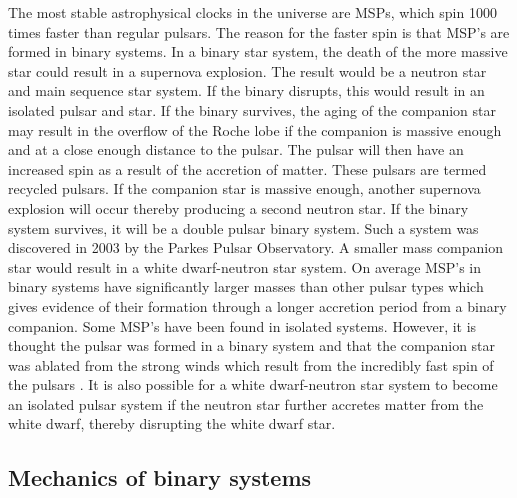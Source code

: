 \documentclass[12pt]{article}
\begin{document}
	
	
	
	
	
	\noindent The most stable astrophysical clocks in the universe are MSPs, which spin 1000 times faster than regular pulsars. The reason for the faster spin is that MSP's are formed in binary systems. In a binary star system, the death of the more massive star could result in a supernova explosion. The result would be a neutron star and main sequence star system. If the binary disrupts, this would result in an isolated pulsar and star. If the binary survives, the aging of the companion star may result in the overflow of the Roche lobe if the companion is massive enough and at a close enough distance to the pulsar. The pulsar will then have an increased spin as a result of the accretion of matter. These pulsars are termed recycled pulsars. If the companion star is massive enough, another supernova explosion will occur thereby producing a second neutron star. If the binary system survives, it will be a double pulsar binary system. Such a system was discovered in 2003 by the Parkes Pulsar Observatory. A smaller mass companion star would result in a white dwarf-neutron star system. On average MSP's in binary systems have significantly larger masses than other pulsar types which gives evidence of their formation through a longer accretion period from a binary companion. Some MSP's have been found in isolated systems. However, it is thought the pulsar was formed in a binary system and that the companion star was ablated from the strong winds which result from the incredibly fast spin of the pulsars \cite{kluzniak1988nature}. It is also possible for a white dwarf-neutron star system to become an isolated pulsar system if the neutron star further accretes matter from the white dwarf, thereby disrupting the white dwarf star. 
	
	\subsection{Mechanics of binary systems}
	\label{sec:Mechanics of binary systems}
	
\end{document}
